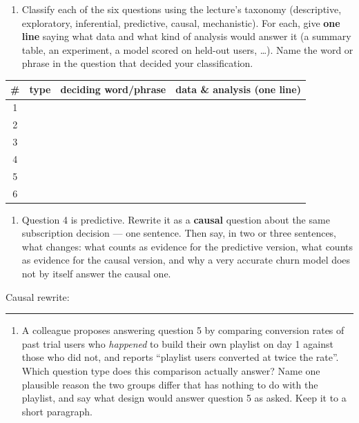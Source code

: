 \documentclass[
  11pt,
]{article}
\providecommand{\tightlist}{%
  \setlength{\itemsep}{0pt}\setlength{\parskip}{0pt}}
\newcommand{\answerspace}[1]{\par\vspace*{#1}}  %
\newcommand{\blank}[1][1.2in]{\rule{#1}{0.4pt}}
\begin{document}
\begin{enumerate}
\def\labelenumi{(\alph{enumi})}
\tightlist
\item
  Classify each of the six questions using the lecture's taxonomy
  (descriptive, exploratory, inferential, predictive, causal,
  mechanistic). For each, give \textbf{one line} saying what data and
  what kind of analysis would answer it (a summary table, an experiment,
  a model scored on held-out users, \ldots). Name the word or phrase in
  the question that decided your classification.
\end{enumerate}

\begin{center}
\begin{tabular}{@{}c p{1.1in} p{1.5in} p{2.9in}@{}}
\toprule
\# & type & deciding word/phrase & data \& analysis (one line) \\ \midrule
1 & \rule{0pt}{0.36in} & & \\ \midrule
2 & \rule{0pt}{0.36in} & & \\ \midrule
3 & \rule{0pt}{0.36in} & & \\ \midrule
4 & \rule{0pt}{0.36in} & & \\ \midrule
5 & \rule{0pt}{0.36in} & & \\ \midrule
6 & \rule{0pt}{0.36in} & & \\ \bottomrule
\end{tabular}\end{center}

\answerspace{0.1in}

\begin{enumerate}
\def\labelenumi{(\alph{enumi})}
\setcounter{enumi}{1}
\tightlist
\item
  Question 4 is predictive. Rewrite it as a \textbf{causal} question
  about the same subscription decision --- one sentence. Then say, in
  two or three sentences, what changes: what counts as evidence for the
  predictive version, what counts as evidence for the causal version,
  and why a very accurate churn model does not by itself answer the
  causal one.
\end{enumerate}

Causal rewrite: \blank[4.4in]

\answerspace{1.5in}

\begin{enumerate}
\def\labelenumi{(\alph{enumi})}
\setcounter{enumi}{2}
\tightlist
\item
  A colleague proposes answering question 5 by comparing conversion
  rates of past trial users who \emph{happened} to build their own
  playlist on day 1 against those who did not, and reports ``playlist
  users converted at twice the rate''. Which question type does this
  comparison actually answer? Name one plausible reason the two groups
  differ that has nothing to do with the playlist, and say what design
  would answer question 5 as asked. Keep it to a short paragraph.
\end{enumerate}
\end{document}

